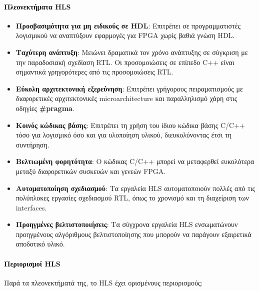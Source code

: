 \paragraph{Πλεονεκτήματα HLS}
\begin{itemize}
  \item \textbf{Προσβασιμότητα για μη ειδικούς σε HDL}: Επιτρέπει σε προγραμματιστές λογισμικού να αναπτύξουν εφαρμογές για FPGA χωρίς βαθιά γνώση HDL.
  
  \item \textbf{Ταχύτερη ανάπτυξη}: Μειώνει δραματικά τον χρόνο ανάπτυξης σε σύγκριση με την παραδοσιακή σχεδίαση RTL. Οι προσομοιώσεις σε επίπεδο C++ είναι σημαντικά γρηγορότερες από τις προσομοιώσεις RTL.
  
  \item \textbf{Εύκολη αρχιτεκτονική εξερεύνηση}: Επιτρέπει γρήγορους πειραματισμούς με διαφορετικές αρχιτεκτονικές microarchitecture και παραλληλισμό χάρη στις οδηγίες \textbf{\#pragma}. 
  
  \item \textbf{Κοινός κώδικας βάσης}: Επιτρέπει τη χρήση του ίδιου κώδικα βάσης C/C++ τόσο για λογισμικό όσο και για υλοποίηση υλικού, διευκολύνοντας έτσι τη συντήρηση.
  
  \item \textbf{Βελτιωμένη φορητότητα}: Ο κώδικας C/C++ μπορεί να μεταφερθεί ευκολότερα μεταξύ διαφορετικών συσκευών και γενεών FPGA.
  
  \item \textbf{Αυτοματοποίηση σχεδιασμού}: Τα εργαλεία HLS αυτοματοποιούν πολλές από τις πολύπλοκες εργασίες σχεδιασμού RTL, όπως το χρονισμό και τη διαχείριση των interfaces.
  
  \item \textbf{Προηγμένες βελτιστοποιήσεις}: Τα σύγχρονα εργαλεία HLS ενσωματώνουν προηγμένους αλγόριθμους βελτιστοποίησης που μπορούν να παράγουν εξαιρετικά αποδοτικό υλικό.
\end{itemize}

\paragraph{Περιορισμοί HLS}
Παρά τα πλεονεκτήματά της, το HLS έχει ορισμένους περιορισμούς:

